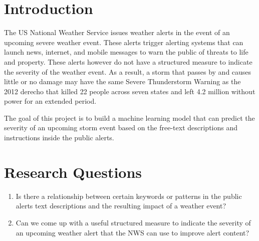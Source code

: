 \documentclass{article}
\begin{document}
 



\section{Introduction}
\label{introduction}
The US National Weather Service issues weather alerts in the event of an upcoming severe weather event. These alerts trigger alerting systems that can launch news, internet, and mobile messages to warn the public of threats to life and property. These alerts however do not have a structured measure to indicate the severity of the weather event. As a result, a storm that passes by and causes little or no damage may have the same Severe Thunderstorm Warning as the 2012 derecho that killed 22 people across seven states and left 4.2 million without power for an extended period.

The goal of this project is to build a machine learning model that can predict the severity of an upcoming storm event based on the free-text descriptions and instructions inside the public alerts. 

\section{Research Questions} 
\label{researchquestions}
\begin{enumerate}
\item
Is there a relationship between certain keywords or patterns in the public alerts text descriptions and the resulting impact of a weather event?
\item 
Can we come up with a useful structured measure to indicate the severity of an upcoming weather alert that the NWS can use to improve alert content?
\end{enumerate}
\end{document}
